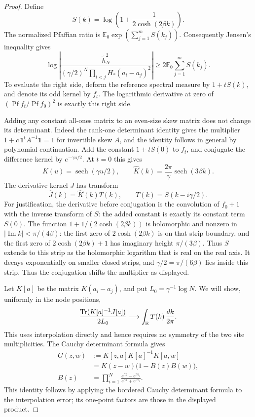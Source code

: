 \begin{proof}
Define
\[
 S(k)=\log\left(1+\frac1{2\cosh(2\beta k)}\right).
\]
The normalized Pfaffian ratio is
\(\mathbb E_0\exp(\sum_{j=1}^m S(k_j))\).
Consequently Jensen's inequality gives
\begin{equation}
 \log\left|
 \frac{\widetilde h_N^2}
 {(\gamma/2)^N\prod_{i<j}H_*(a_i-a_j)^2}
 \right|
 \ge 2\mathbb E_0\sum_{j=1}^m S(k_j).
 \label{eq:06-jensen}
\end{equation}
To evaluate the right side, deform the reference spectral measure
by \(1+tS(k)\), and denote its odd kernel by \(f_t\).
The logarithmic derivative at zero of
\((\operatorname{Pf}f_t/\operatorname{Pf}f_0)^2\) is exactly this
right side.

Adding any constant all-ones matrix to an even-size skew matrix
does not change its determinant.  Indeed the rank-one determinant
identity gives the multiplier
\(1+c\,\mathbf1^{\mathsf t}A^{-1}\mathbf1=1\) for invertible skew
\(A\), and the identity follows in general by polynomial
continuation.  Add the constant \(1+tS(0)\) to \(f_t\), and
conjugate the difference kernel by \(e^{-\gamma u/2}\).
At \(t=0\) this gives
\[
 K(u)=\operatorname{sech}(\gamma u/2),\qquad
 \widehat K(k)=\frac{2\pi}{\gamma}\operatorname{sech}(3\beta k).
\]
The derivative kernel \(J\) has transform
\[
 \widehat J(k)=\widehat K(k)T(k),\qquad
 T(k)=S(k-i\gamma/2).
\]
For justification, the derivative before conjugation is the
convolution of \(f_0+1\) with the inverse transform of \(S\):
the added constant is exactly its constant term \(S(0)\).
The function \(1+1/(2\cosh(2\beta k))\) is holomorphic and nonzero in
\(|\operatorname{Im} k|<\pi/(4\beta)\): the first zero of
\(2\cosh(2\beta k)\) is on that strip boundary, and the first zero
of \(2\cosh(2\beta k)+1\) has imaginary height \(\pi/(3\beta)\).
Thus \(S\) extends to this strip as the holomorphic logarithm that
is real on the real axis. It decays exponentially
on smaller closed strips, and $\gamma/2=\pi/(6\beta)$ lies inside
this strip. Thus the conjugation shifts the multiplier as displayed.

Let \(K[a]\) be the matrix \(K(a_i-a_j)\), and put
\(L_0=\gamma^{-1}\log N\).
We will show, uniformly in the node positions,
\begin{equation}
 \frac{\operatorname{Tr}(K[a]^{-1}J[a])}{2L_0}
 \longrightarrow\int_{\mathbb R}T(k)\,\frac{dk}{2\pi}.
 \label{eq:06-trace-limit}
\end{equation}
This uses interpolation directly and hence requires no symmetry of
the two site multiplicities.
The Cauchy determinant formula gives
\[
\begin{split}
 G(z,w)&:=K[z,a]K[a]^{-1}K[a,w]\\
 &=K(z-w)\bigl(1-B(z)B(w)\bigr),\\
 B(z)&=\prod_{i=1}^N
 \frac{e^{\gamma z}-e^{\gamma a_i}}
 {e^{\gamma z}+e^{\gamma a_i}} .
\end{split}
\]
This identity follows by applying the bordered Cauchy determinant
formula to the interpolation error; its one-point factors are those
in the displayed product.


\end{proof}
